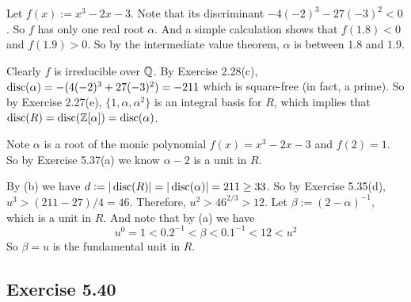\documentclass[../Marcus.tex]{subfiles}
\begin{document}
Let $f(x):=x^3-2x-3$. Note that its discriminant $-4(-2)^3-27(-3)^2 < 0$. So $f$ has only one real root $\alpha$. And a simple calculation shows that $f(1.8) < 0 $ and $f(1.9) > 0$. So by the intermediate value theorem, $\alpha$ is between $1.8$ and $1.9$.

Clearly $f$ is irreducible over $\mathbb{Q}$. By Exercise 2.28(c), $\operatorname{disc}(\alpha) = -(4(-2)^3+27(-3)^2) = -211$ which is square-free (in fact, a prime). So by Exercise 2.27(e), $\{1,\alpha,\alpha^2\}$ is an integral basis for $R$, which implies that $\operatorname{disc}(R) = \operatorname{disc}(\mathbb{Z}[\alpha]) = \operatorname{disc}(\alpha)$.

Note $\alpha$ is a root of the monic polynomial $f(x)=x^3-2x-3$ and $f(2)=1$. So by Exercise 5.37(a) we know $\alpha-2$ is a unit in $R$.

By (b) we have $d := |\operatorname{disc}(R)| = |\operatorname{disc}(\alpha)| = 211 \geq 33$. So by Exercise 5.35(d), $u^3 > (211-27)/4 = 46$. Therefore, $u^2 > 46^{2/3} > 12$. Let $\beta:=(2-\alpha)^{-1}$, which is a unit in $R$. And note that by (a) we have
$$
u^0 = 1 < 0.2^{-1} < \beta < 0.1^{-1} < 12 < u^2
$$
So $\beta=u$ is the fundamental unit in $R$.

\subsection*{Exercise 5.40}

\begin{comment}
(a) Let $f(x):=x^3+ax-1$. The only possible rational roots of $f$ are $\pm1$, which clearly do not satisfy $f$. So $f$ is irreducible over $\QQ$. Note that its discriminant $-4a^3-27(-1)^2 = -4a^3-27 < 0$ for all $a\in\NN$. So $f$ has only one real root $\alpha$.

(b) By Exercise 2.28(c), $\disc(\alpha) = -(4a^3+27)$.

(c) Suppose $\disc(\alpha) = -(4a^3+27)$ is square-free. Then by Exercise 2.27(e), $\{1,\alpha,\alpha^2\}$ is an integral basis for $R$, which implies that $\disc(R) = \disc(\ZZ[\alpha]) = \disc(\alpha)$. Now, by (b) we have $d := |\disc(R)| = |\disc(\alpha)| = 4a^3+27 \geq 33$ for all $a \geq 2$. (Since $u>1$ so we can only consider $a\geq2$.) So by Exercise 5.35(d), $u^3 > (d-27)/4 = a^3$. Therefore, $u>a$. 

On the other hand, note $\alpha$ is a root of the monic polynomial $f(x)=x^3+ax-1$ and $f(0)=-1$. So by Exercise 5.37(a) we know $\alpha$ is a unit in $R$. Moreover, we see that $f(0)<0$ and $f(1)=a>0$. So by the intermediate value theorem, $\alpha$ is between $0$ and $1$.

Since $\alpha^{-1}>1$ is a unit, so $\alpha^{-1} = u^k > a$ for some $k\in\NN$. Moreover, the two facts $\alpha > \alpha^3$ and $\alpha^3+a\alpha-1=0$ give us $\alpha^{-1} < a+1$. So we have $\alpha^{-1}$ is between $a$ and $a+1$.

Suppose now $a\geq2$, then we have
$$
u^0 = 1 < a < \alpha^{-1} = u^k < a+1 < u+1 < u^2
$$
(As $u>a\geq2$, it's easy to check that $u+1<u^2$.) So $\alpha^{-1}=u$ is the fundamental unit in $R$.
\end{comment}
\end{document}
